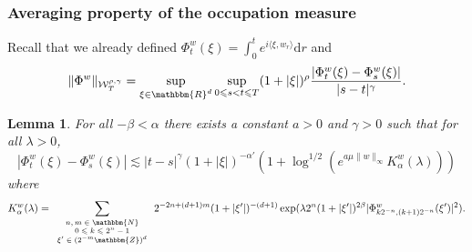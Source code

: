 \documentclass[a4paper,11pt]{article}
\newcommand{\mathd}{\mathrm{d}}
\newcommand{\tmscript}[1]{\text{\scriptsize{$#1$}}}
\newtheorem{lemma}[theorem]{Lemma}
\begin{document}
\subsubsection{Averaging property of the occupation measure}



Recall that we already defined $\Phi^{w}_{t} ( \xi ) = \int_{0}^{t} e^{i
\langle \xi ,w_{r} \rangle} \mathd r$ and
\[ \| \Phi^{w} \|_{\mathcal{W}^{\rho , \gamma}_{T}} = \sup_{\xi \in
   \mathbbm{R}^{d}}   \sup_{0 \leqslant s<t \leqslant T} ( 1+ | \xi | )^{\rho}
   \frac{| \Phi^{w}_{t} ( \xi )- \Phi^{w}_{s} ( \xi ) |}{|s-t|^{\gamma}} . \]


\begin{lemma}
  \label{lemma:chaining-Y}For all $- \beta < \alpha$ there exists a constant
  $a>0$ and $\gamma >0$ such that for all $\lambda >0$,
  \[ | \Phi^{w}_{t} ( \xi )- \Phi^{w}_{s} ( \xi ) | \lesssim | t-s |^{\gamma}
     ( 1+ | \xi | )^{- \alpha'} ( 1+ \log^{1/2} ( e^{a \mu \| w \|_{\infty}}
     K^{w}_{\alpha} ( \lambda ) ) ) \]
  where
  \[ K^{w}_{\alpha} ( \lambda ) = \sum_{\tmscript{\begin{array}{c}
       n,m \in \mathbbm{N}\\
       0 \leqslant k \leqslant 2^{n} -1\\
       \xi' \in ( 2^{-m} \mathbbm{Z} )^{d}
     \end{array}}} 2^{-2n+ ( d+1 ) m} ( 1+ | \xi' | )^{- ( d+1 )} \exp (
     \lambda 2^{n} ( 1+ | \xi' | )^{2 \beta} | \Phi^{w}_{k2^{-n} , ( k+1 )
     2^{-n}} ( \xi' ) |^{2} ) . \]
\end{lemma}
\end{document}
